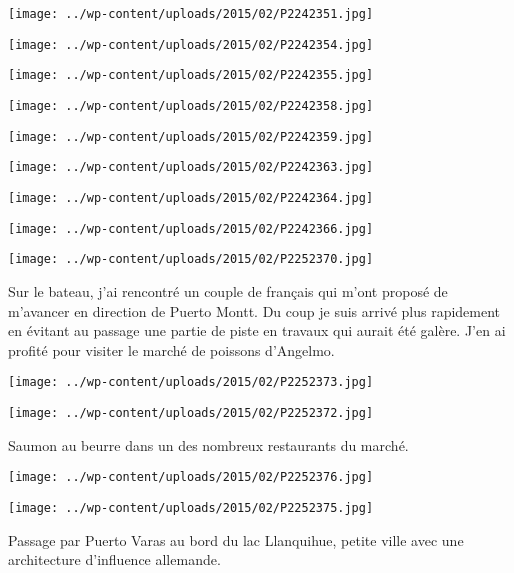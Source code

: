  \newline
\centerline{\texttt{[image: ../wp-content/uploads/2015/02/P2242351.jpg]} } 
 \newline
 \newline
\centerline{\texttt{[image: ../wp-content/uploads/2015/02/P2242354.jpg]} } 
\newline
\centerline{\texttt{[image: ../wp-content/uploads/2015/02/P2242355.jpg]} } 
 \newline
\centerline{\texttt{[image: ../wp-content/uploads/2015/02/P2242358.jpg]} } 
 \newline
\centerline{\texttt{[image: ../wp-content/uploads/2015/02/P2242359.jpg]} } 
 \newline
\centerline{\texttt{[image: ../wp-content/uploads/2015/02/P2242363.jpg]} } 
 \newline
\centerline{\texttt{[image: ../wp-content/uploads/2015/02/P2242364.jpg]} } 
 \newline
\centerline{\texttt{[image: ../wp-content/uploads/2015/02/P2242366.jpg]} } 
 \newline
\centerline{\texttt{[image: ../wp-content/uploads/2015/02/P2252370.jpg]} } 
Sur le bateau, j'ai rencontré un couple de français qui m'ont proposé de m'avancer en direction de Puerto Montt. Du coup je suis arrivé plus rapidement en évitant au passage une partie de piste en travaux qui aurait été galère. \newline
 J'en ai profité pour visiter le marché de poissons d'Angelmo. \newline
 \newline
\centerline{\texttt{[image: ../wp-content/uploads/2015/02/P2252373.jpg]} } 
 \newline
\centerline{\texttt{[image: ../wp-content/uploads/2015/02/P2252372.jpg]} } 
 \newline
 Saumon au beurre dans un des nombreux restaurants du marché. \newline
 \newline
\centerline{\texttt{[image: ../wp-content/uploads/2015/02/P2252376.jpg]} } 
 \newline
\centerline{\texttt{[image: ../wp-content/uploads/2015/02/P2252375.jpg]} } 
 \newline
 Passage par Puerto Varas au bord du lac Llanquihue, petite ville avec une architecture d'influence allemande. \newline
